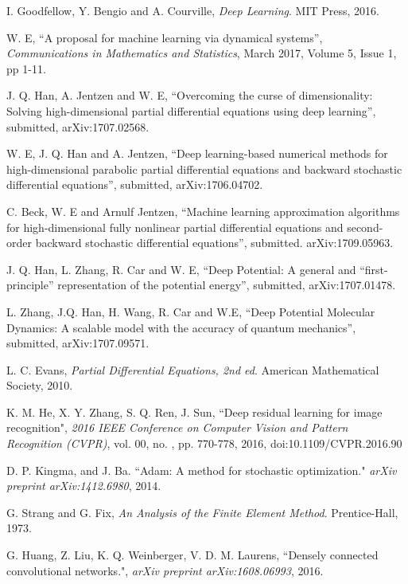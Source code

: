 \documentclass[a4paper,12pt]{article}
\begin{document}
\begin{thebibliography}{12}

I. Goodfellow, Y. Bengio and A. Courville, {\em Deep Learning}. MIT Press, 2016.

W. E, ``A proposal for machine learning via dynamical systems'',
{\em Communications in Mathematics and Statistics},
March 2017, Volume 5, Issue 1, pp 1-11.

J. Q. Han,  A. Jentzen and W. E, 
``Overcoming the curse of dimensionality:
Solving high-dimensional partial differential equations using deep learning'',
submitted,
arXiv:1707.02568.

W. E, J. Q.  Han and A. Jentzen,
``Deep learning-based numerical methods for high-dimensional
parabolic partial differential equations and backward stochastic
differential equations'', submitted,
arXiv:1706.04702.

C. Beck, W. E and Arnulf Jentzen,
``Machine learning approximation algorithms
for high-dimensional fully nonlinear partial differential equations and 
second-order backward stochastic differential equations'',
submitted.  arXiv:1709.05963.

J. Q. Han, L. Zhang, R. Car and W. E,
``Deep Potential: A general and ``first-principle'' 
representation of the potential energy'', submitted,
arXiv:1707.01478.

L. Zhang, J.Q. Han, H. Wang, R. Car and W.E,
``Deep Potential Molecular Dynamics:
A scalable model with the accuracy of quantum mechanics'',
submitted,
arXiv:1707.09571.

L. C. Evans, {\em Partial Differential Equations, 2nd ed}.  American Mathematical Society, 2010.

K. M. He, X. Y. Zhang, S. Q. Ren, J. Sun, ``Deep residual learning for image recognition", {\em 2016 IEEE Conference on Computer Vision and Pattern Recognition (CVPR)}, vol. 00, no. , pp. 770-778, 2016, doi:10.1109/CVPR.2016.90 

D. P. Kingma, and J. Ba. ``Adam: A method for stochastic optimization." {\em arXiv preprint arXiv:1412.6980}, 2014.

G. Strang and G. Fix, {\em An Analysis of the Finite Element Method}. Prentice-Hall, 1973.

G. Huang, Z. Liu, K. Q. Weinberger, V. D. M. Laurens, ``Densely connected convolutional networks.", {\em arXiv preprint arXiv:1608.06993}, 2016.
\end{thebibliography}
\end{document}
